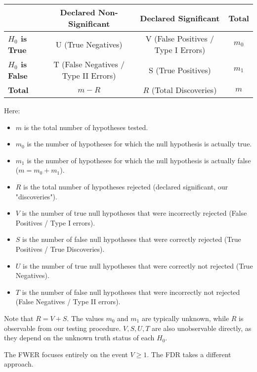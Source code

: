 \documentclass[12pt]{book}
\newcommand{\Hnull}{H_0}                 %
\begin{document}
\begin{center}
\begin{tabular}{lccc}
\toprule
                     & \textbf{Declared Non-Significant} & \textbf{Declared Significant} & \textbf{Total} \\
\midrule
\textbf{$\Hnull$ is True}    & U (True Negatives)        & V (False Positives / Type I Errors) & $m_0$ \\
\textbf{$\Hnull$ is False}   & T (False Negatives / Type II Errors) & S (True Positives)        & $m_1$ \\
\midrule
\textbf{Total}               & $m-R$                     & $R$ (Total Discoveries)       & $m$ \\
\bottomrule
\end{tabular}
\end{center}

Here:
\begin{itemize}
    \item $m$ is the total number of hypotheses tested.
    \item $m_0$ is the number of hypotheses for which the null hypothesis is actually true.
    \item $m_1$ is the number of hypotheses for which the null hypothesis is actually false ($m = m_0 + m_1$).
    \item $R$ is the total number of hypotheses rejected (declared significant, our "discoveries").
    \item $V$ is the number of true null hypotheses that were incorrectly rejected (False Positives / Type I errors).
    \item $S$ is the number of false null hypotheses that were correctly rejected (True Positives / True Discoveries).
    \item $U$ is the number of true null hypotheses that were correctly not rejected (True Negatives).
    \item $T$ is the number of false null hypotheses that were incorrectly not rejected (False Negatives / Type II errors).
\end{itemize}
Note that $R = V + S$. The values $m_0$ and $m_1$ are typically unknown, while $R$ is observable from our testing procedure. $V, S, U, T$ are also unobservable directly, as they depend on the unknown truth status of each $\Hnull$.

The FWER focuses entirely on the event $V \ge 1$. The FDR takes a different approach.
\end{document}
